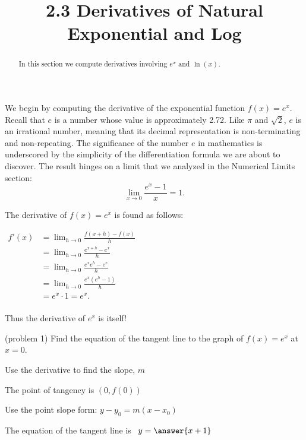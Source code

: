 \documentclass{ximera}
\title{2.3 Derivatives of Natural Exponential and Log}
\begin{document}
\begin{abstract}
In this section we compute derivatives involving $e^x$ and $\ln(x)$.
\end{abstract}

\maketitle






We begin by computing the derivative of the exponential function $f(x) = e^x$.  Recall that $e$ is a number whose value is approximately 2.72.
Like $\pi$ and $\sqrt 2$, $e$ is an irrational number, meaning that its decimal representation is non-terminating and non-repeating. The significance of the number $e$ in mathematics
is underscored by the simplicity of the differentiation formula we are about to discover. 
The result hinges on a limit that we analyzed in the Numerical Limits section:
\[
\lim_{x \to 0} \frac{e^x - 1}{x} = 1.
\]

The derivative of $f(x) = e^x$ is found as follows:

\begin{center}
$\begin{aligned}
f'(x) &= \lim_{h \to 0} \frac{f(x+h)-f(x)}{h} \\[5pt]
&= \lim_{h \to 0}\frac{e^{x+h}-e^x}{h}\\[5pt]
&= \lim_{h \to 0} \frac{e^x e^h-e^x}{h}\\[5pt]
&= \lim_{h \to 0} \frac{e^x (e^h-1)}{h}\\[5pt]
&= e^x \cdot 1 = e^x.\\[-5pt]
\end{aligned}$
\end{center}

Thus the derivative of $e^x$ is itself!




\begin{problem}(problem 1)
Find the equation of the tangent line to the graph of $f(x) = e^x$ at $x = 0$.
\begin{hint}
Use the derivative to find the slope, $m$
\end{hint}
\begin{hint}
The point of tangency is $(0, f(0))$
\end{hint}
\begin{hint}
Use the point slope form: $y-y_0 = m(x-x_0)$
\end{hint}

The equation of the tangent line is \ $y = \answer{x+1}$
\end{problem}
\end{document}
